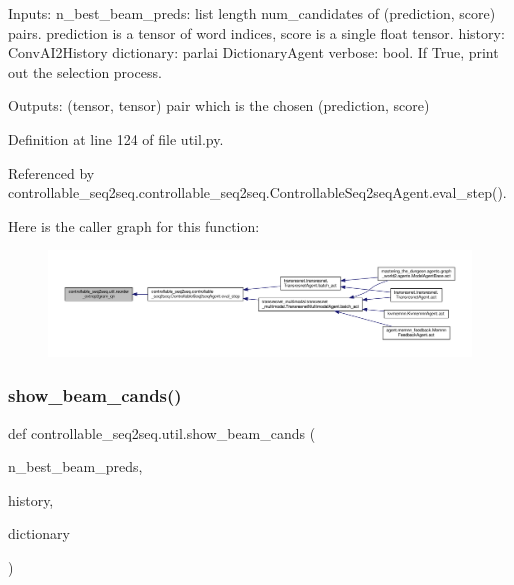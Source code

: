 \begin{DoxyVerb}Inputs:
    n_best_beam_preds: list length num_candidates of (prediction, score) pairs.
      prediction is a tensor of word indices, score is a single float tensor.
    history: ConvAI2History
    dictionary: parlai DictionaryAgent
    verbose: bool. If True, print out the selection process.

Outputs: (tensor, tensor) pair which is the chosen (prediction, score)
\end{DoxyVerb}
 

Definition at line 124 of file util.\+py.



Referenced by controllable\+\_\+seq2seq.\+controllable\+\_\+seq2seq.\+Controllable\+Seq2seq\+Agent.\+eval\+\_\+step().

Here is the caller graph for this function\+:
\nopagebreak
\begin{figure}[H]
\begin{center}
\leavevmode
\includegraphics[width=350pt]{namespacecontrollable__seq2seq_1_1util_ab2f0e2b4043e6e1fbd59ca27b9383dc0_icgraph}
\end{center}
\end{figure}
\mbox{\label{namespacecontrollable__seq2seq_1_1util_a616447119991c41cded3c7a8c3e01acc}} 
\subsubsection{\texorpdfstring{show\+\_\+beam\+\_\+cands()}{show\_beam\_cands()}}
{\footnotesize\ttfamily def controllable\+\_\+seq2seq.\+util.\+show\+\_\+beam\+\_\+cands (\begin{DoxyParamCaption}\item[{}]{n\+\_\+best\+\_\+beam\+\_\+preds,  }\item[{}]{history,  }\item[{}]{dictionary }\end{DoxyParamCaption})}


